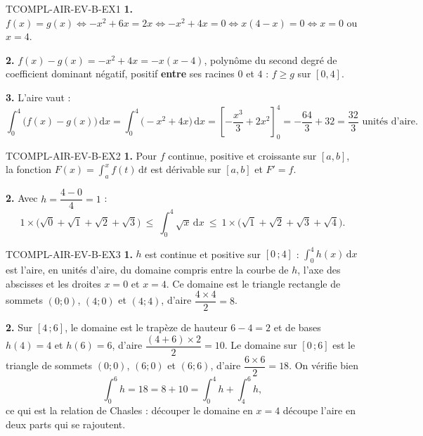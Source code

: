 %
\begin{corrige}{TCOMPL-AIR-EV-B-EX1}
\textbf{1.} $f(x)=g(x) \iff -x^2+6x=2x \iff -x^2+4x=0 \iff x(4-x)=0 \iff x=0$ ou $x=4$.

\textbf{2.} $f(x)-g(x) = -x^2+4x = -x(x-4)$, polynôme du second degré de coefficient dominant négatif, positif \textbf{entre} ses racines $0$ et $4$ : $f\geq g$ sur $[0,4]$.

\textbf{3.} L'aire vaut :
\[
  \int_0^4 \big(f(x)-g(x)\big)\,\mathrm{d}x = \int_0^4 \big(-x^2+4x\big)\,\mathrm{d}x = \left[-\frac{x^3}{3}+2x^2\right]_0^4 = -\frac{64}{3}+32 = \frac{32}{3} \text{ unités d'aire.}
\]
\end{corrige}

\begin{corrige}{TCOMPL-AIR-EV-B-EX2}
\textbf{1.} Pour $f$ continue, positive et croissante sur $[a,b]$, la fonction $F(x)=\displaystyle\int_a^x f(t)\,\mathrm{d}t$ est dérivable sur $[a,b]$ et $F'=f$.

\textbf{2.} Avec $h=\dfrac{4-0}{4}=1$ :
\[
  1\times\big(\sqrt{0}+\sqrt{1}+\sqrt{2}+\sqrt{3}\big) \ \leq\ \int_0^4 \sqrt{x}\,\mathrm{d}x \ \leq\ 1\times\big(\sqrt{1}+\sqrt{2}+\sqrt{3}+\sqrt{4}\big).
\]
\end{corrige}

\begin{corrige}{TCOMPL-AIR-EV-B-EX3}
\textbf{1.} $h$ est continue et positive sur $[0\,;4]$ : $\displaystyle\int_0^4 h(x)\,\mathrm{d}x$ est l'aire, en unités d'aire, du domaine compris entre la courbe de $h$, l'axe des abscisses et les droites $x=0$ et $x=4$. Ce domaine est le triangle rectangle de sommets $(0;0)$, $(4;0)$ et $(4;4)$, d'aire $\dfrac{4\times4}{2}=8$.

\textbf{2.} Sur $[4\,;6]$, le domaine est le trapèze de hauteur $6-4=2$ et de bases $h(4)=4$ et $h(6)=6$, d'aire $\dfrac{(4+6)\times2}{2}=10$. Le domaine sur $[0\,;6]$ est le triangle de sommets $(0;0)$, $(6;0)$ et $(6;6)$, d'aire $\dfrac{6\times6}{2}=18$. On vérifie bien
\[
  \int_0^6 h = 18 = 8 + 10 = \int_0^4 h + \int_4^6 h,
\]
ce qui est la relation de Chasles : découper le domaine en $x=4$ découpe l'aire en deux parts qui se rajoutent.
\end{corrige}
